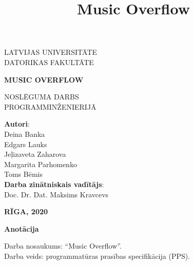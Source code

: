 \documentclass[12pt]{article}
\title{Music Overflow}
\begin{document}
\begin{titlepage}
	\begin{center}
		\vspace*{1cm}
 
       LATVIJAS UNIVERSITĀTE \\
       DATORIKAS FAKULTĀTE
 
       \vspace{3cm}
 
       \textbf{\Huge{MUSIC OVERFLOW}}
       
       \vspace{5cm}
       \large{NOSLĒGUMA DARBS\\
       PROGRAMMINŽENIERIJĀ}
       
     \end{center}
       \vfill
       
       \begin{flushright}
       \textbf{Autori}:\\
		Deina Banka\\
		Edgars Lauks\\
		Jeļizaveta Zaharova\\
		Margarita Parhomenko\\
		Toms Bēmis\\
		\bigskip
		\textbf{Darba zinātniskais vadītājs}:\\ Doc. Dr. Dat. Maksims Kravcevs
       \end{flushright}
       
		\vspace{1cm}       
       
       \begin{center}
       \textbf{RĪGA, 2020}
       \end{center}
 
\end{titlepage}

\begin{center}
\textbf{\large Anotācija}
\end{center}

\indent Darba nosaukums: ``Music Overflow''.\\
\indent Darba veids: programmatūras prasības specifikācija (PPS).\\
\end{document}
